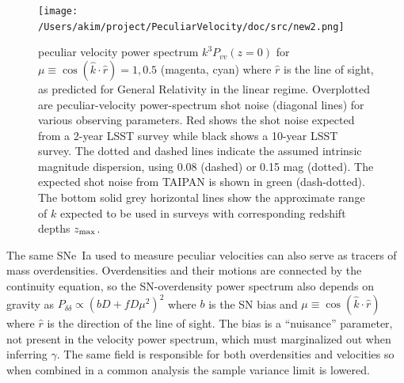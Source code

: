 \documentclass[11pt, oneside]{article}   	%
\begin{document}
\begin{figure}[h]
\centering
\texttt{[image: /Users/akim/project/PeculiarVelocity/doc/src/new2.png]}
\caption{ peculiar velocity power spectrum $k^3P_{vv}(z=0)$ for $\mu \equiv \cos{(\hat{k} \cdot \hat{r})}=1, 0.5$ (magenta, cyan) 
where $\hat{r}$ is the line of sight, as predicted for General Relativity in the linear regime.
Overplotted are peculiar-velocity power-spectrum shot noise  (diagonal lines) for various observing parameters.  Red shows the shot noise expected from a 2-year LSST survey
while black shows a 10-year LSST survey.  The dotted and dashed lines indicate the assumed intrinsic magnitude dispersion, using 0.08 (dashed) or 0.15 mag (dotted).  The expected shot
noise from TAIPAN is shown in green (dash-dotted). 
%
The bottom solid grey horizontal lines show the approximate range of $k$ expected to be used in surveys with corresponding
redshift depths $z_{\rm max}$.
\label{power:fig}}
\end{figure}

The same SNe~Ia used  to measure peculiar velocities can also serve as tracers of mass overdensities.  Overdensities and their motions are connected by the
continuity equation, so the SN-overdensity power spectrum also depends on gravity 
as $P_{\delta \delta }\propto (bD + fD\mu^2)^2$ where $b$ is the SN bias and $\mu\equiv \cos{(\hat{k} \cdot \hat{r})}$ where $\hat{r}$ is the direction of
the line of sight.  
The bias is a ``nuisance'' parameter, not present in the velocity power spectrum, which must marginalized out when inferring $\gamma$.
The same field is responsible for both overdensities and velocities so when combined in a common analysis the sample variance limit is lowered.
\end{document}
